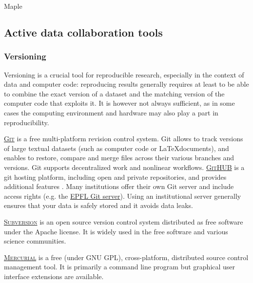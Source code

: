 Maple

\subsection{Active data collaboration tools}

\subsubsection{Versioning}

\noindent Versioning is a crucial tool for reproducible research, especially in the context of data and computer code: reproducing results generally requires at least to be able to combine the exact version of a dataset and the matching version of the computer code that exploits it. It is however not always sufficient, as in some cases the computing environment and hardware may also play a part in reproducibility.

\vspace{0.4cm}

\noindent {} \textsc{\href{https://git-scm.com/}{Git}} is a free multi-platform revision control system. Git allows to track versions of large textual datasets (such as computer code or \LaTeX documents), and enables to restore, compare and merge files across their various branches and versions. Git supports decentralized work and nonlinear workflows.  \textsc{\href{https://github.com/}{GitHUB}} is a git hosting platform, including open and private repositories, and provides additional features \cite{_git_2015,github_github_2015}. Many institutions offer their own Git server and include access rights (e.g. the \href{http://git.epfl.ch}{EPFL Git server}). Using an institutional server generally ensures that your data is safely stored and it avoids data leaks. 

\vspace{0.4cm}

\noindent {} \textsc{\href{http://subversion.apache.org}{Subversion}} is an open source version control system distributed as free software under the Apache license. It is widely used in the free software and various science communities.

\vspace{0.4cm}

\noindent {} \textsc{\href{https://www.mercurial-scm.org}{Mercurial}} is a free (under GNU GPL), cross-platform, distributed source control management tool. It is primarily a command line program but graphical user interface extensions are available. 

